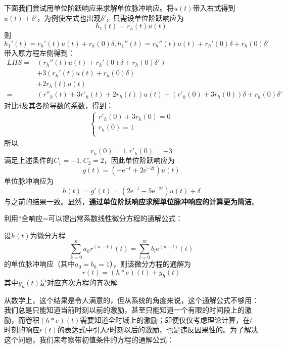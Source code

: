 \documentclass{ctexbook}
\begin{document}
\begin{example}
    下面我们尝试用单位阶跃响应来求解单位脉冲响应。将$u(t)$带入右式得到$u(t)+\delta'$，为例使左式也出现$\delta'$，只需设单位阶跃响应为
    $$h_1(t)=r_h(t)u(t)$$
    则
    $$h_1'(t)=r_h'(t)u(t)+r_h(0)\delta,h_1''(t)=r_h''(t)u(t)+r_h'(0)\delta+r_h(0)\delta'$$
    带入原方程左侧得到：\begin{align*}
        LHS=&\left(r_h''(t)u(t)+r_h'(0)\delta+r_h(0)\delta'\right)\\
        &+3\left(r_h'(t)u(t)+r_h(0)\delta\right)\\
        &+2r_h(t)u(t)\\
        =&\left(r''_h(t)+3r'_h(t)+2r_h(t)\right)u(t)+\left(r'_h(0)+3r_h(0)\right)\delta+r_h(0)\delta'
    \end{align*}
    对比$\delta$及其各阶导数的系数，得到：\begin{align*}
        \begin{cases}
            r'_h(0)+3r_h(0)=0\\
            r_h(0)=1\\
        \end{cases}
    \end{align*}
    所以$$r_h(0)=1,r'_h(0)=-3$$
    满足上述条件的$C_1=-1,C_2=2$，因此单位阶跃响应为
    $$g(t)=(-\mathrm{e}^{-t}+2\mathrm{e}^{-2t})u(t)$$
    单位脉冲响应为
    $$h(t)=g'(t)=\left(2\mathrm{e}^{-t}-5\mathrm{e}^{-2t}\right)u(t)+\delta$$
    与之前的结果一致。显然，\textbf{通过单位阶跃响应求解单位脉冲响应的计算更为简洁}。
\end{example}

利用“全响应=可以提出常系数线性微分方程的通解公式：
\begin{theorem}
    设$h(t)$为微分方程
    \[\sum_{k=0}^{n}a_{k} r^{(n-k)}(t)=\sum_{l=0}^{m}b_{l} \mathrm{e}^{(n-l)}(t)\]
    的单位脉冲响应（其中$a_0=b_0=1$），则该微分方程的通解为
    \[r(t)=(h*e)(t)+y_h(t)\]
    其中$y_h(t)$是对应齐次方程的齐次解
\end{theorem}

从数学上，这个结果是令人满意的，但从系统的角度来说，这个通解公式不够用：我们总是只能知道当前时刻以前的激励，甚至只能知道一个有限的时间段上的激励，而卷积$(h*e)(t)$需要知道全时域上的激励；即便仅仅考虑理论计算，在$t$时刻的响应$r(t)$的表达式中引入$t$时刻以后的激励，也是违反因果性的。为了解决这个问题，我们来考察带初值条件的方程的通解公式：
\end{document}
